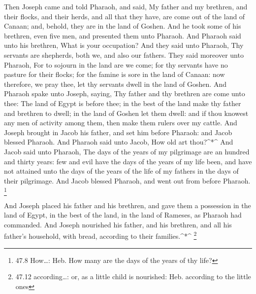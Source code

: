  Then Joseph came and told Pharaoh, and said, My father and
my brethren, and their flocks, and their herds, and all that they have,
are come out of the land of Canaan; and, behold, they are in the land of
Goshen.  And he took some of his brethren, even five men,
and presented them unto Pharaoh.  And Pharaoh said unto his
brethren, What is your occupation? And they said unto Pharaoh, Thy
servants are shepherds, both we, and also our fathers.  They
said moreover unto Pharaoh, For to sojourn in the land are we come; for
thy servants have no pasture for their flocks; for the famine is sore in
the land of Canaan: now therefore, we pray thee, let thy servants dwell
in the land of Goshen.  And Pharaoh spake unto Joseph,
saying, Thy father and thy brethren are come unto thee:  The
land of Egypt is before thee; in the best of the land make thy father
and brethren to dwell; in the land of Goshen let them dwell: and if thou
knowest any men of activity among them, then make them rulers over my
cattle.  And Joseph brought in Jacob his father, and set him
before Pharaoh: and Jacob blessed Pharaoh.  And Pharaoh said
unto Jacob, How old art thou?\^{}*\^{}  And Jacob said unto
Pharaoh, The days of the years of my pilgrimage are an hundred and
thirty years: few and evil have the days of the years of my life been,
and have not attained unto the days of the years of the life of my
fathers in the days of their pilgrimage.  And Jacob blessed
Pharaoh, and went out from before Pharaoh. \footnote{47.8 How\ldots:
  Heb. How many are the days of the years of thy life?}

 And Joseph placed his father and his brethren, and gave
them a possession in the land of Egypt, in the best of the land, in the
land of Rameses, as Pharaoh had commanded.  And Joseph
nourished his father, and his brethren, and all his father's household,
with bread, according to their families.\^{}*\^{} \footnote{47.12
  according\ldots: or, as a little child is nourished: Heb. according to
  the little ones}

